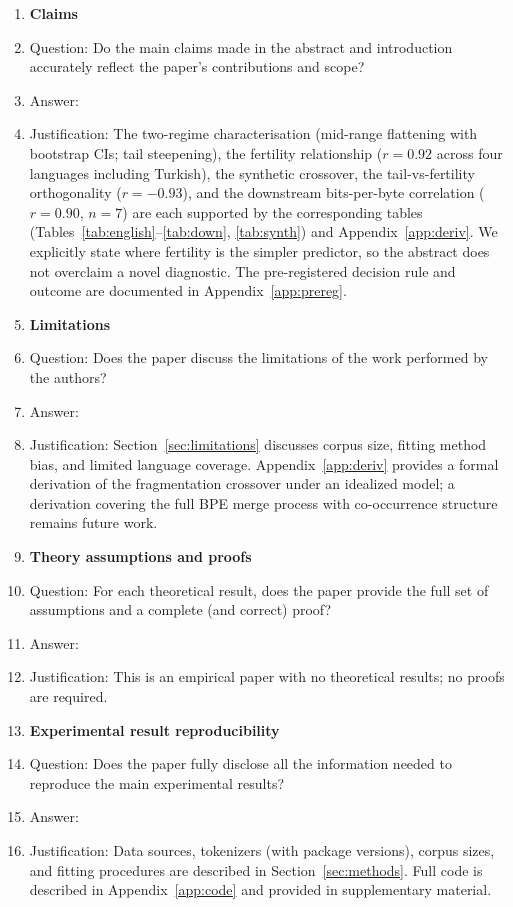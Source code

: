 \documentclass{article}
\begin{document}
\begin{enumerate}

\item {\bf Claims}
    \item[] Question: Do the main claims made in the abstract and introduction accurately reflect the paper's contributions and scope?
    \item[] Answer: \answerYes{}
    \item[] Justification: The two-regime characterisation (mid-range flattening with bootstrap CIs; tail steepening), the fertility relationship ($r = 0.92$ across four languages including Turkish), the synthetic crossover, the tail-vs-fertility orthogonality ($r = -0.93$), and the downstream bits-per-byte correlation ($r = 0.90$, $n=7$) are each supported by the corresponding tables (Tables~\ref{tab:english}--\ref{tab:down}, \ref{tab:synth}) and Appendix~\ref{app:deriv}. We explicitly state where fertility is the simpler predictor, so the abstract does not overclaim a novel diagnostic. The pre-registered decision rule and outcome are documented in Appendix~\ref{app:prereg}.

\item {\bf Limitations}
    \item[] Question: Does the paper discuss the limitations of the work performed by the authors?
    \item[] Answer: \answerYes{}
    \item[] Justification: Section~\ref{sec:limitations} discusses corpus size, fitting method bias, and limited language coverage. Appendix~\ref{app:deriv} provides a formal derivation of the fragmentation crossover under an idealized model; a derivation covering the full BPE merge process with co-occurrence structure remains future work.

\item {\bf Theory assumptions and proofs}
    \item[] Question: For each theoretical result, does the paper provide the full set of assumptions and a complete (and correct) proof?
    \item[] Answer: \answerNA{}
    \item[] Justification: This is an empirical paper with no theoretical results; no proofs are required.

\item {\bf Experimental result reproducibility}
    \item[] Question: Does the paper fully disclose all the information needed to reproduce the main experimental results?
    \item[] Answer: \answerYes{}
    \item[] Justification: Data sources, tokenizers (with package versions), corpus sizes, and fitting procedures are described in Section~\ref{sec:methods}. Full code is described in Appendix~\ref{app:code} and provided in supplementary material.


\end{enumerate}
\end{document}
